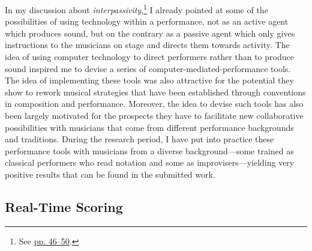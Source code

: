 In my discussion about \emph{interpassivity},\footnote{See \hyperlink{interpassiv}{pp. 46--50}.} I already pointed at some of the possibilities of using technology within a performance, not as an active agent which produces sound, but on the contrary as a passive agent which only gives instructions to the musicians on stage and directs them towards activity. The idea of using computer technology to direct performers rather than to produce sound inspired me to devise a series of computer-mediated-performance tools. The idea of implementing these tools was also attractive for the potential they show to rework musical strategies that have been established through conventions in composition and performance. Moreover, the idea to devise such tools has also been largely motivated for the prospects they have to facilitate new collaborative possibilities with musicians that come from different performance backgrounds and traditions. During the research period, I have put into practice these performance tools with musicians from a diverse background---some trained as classical performers who read notation and some as improvisers---yielding very positive results that can be found in the submitted work.

\hypertarget{realtimescore}{}
\subsection{Real-Time Scoring}

